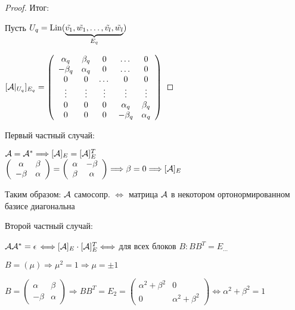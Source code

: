 \begin{theorem}
\begin{proof}
    Итог: 

    Пусть $U_q = \operatorname{Lin} (\underbrace{\tilde{v_1}, \tilde{w_1}, \dots, \tilde{v_l}, \tilde{w_l}}_{\text{$ E_q $}} )$
    
    $[\mathcal{A} |_{U_q}]_{E_q} = \left(\begin{array}{ccccc}
    \alpha_q & \beta_q & 0 & \dots & 0 \\ 
    -\beta_q & \alpha_q & 0 & \dots & 0 \\ 
    0 & 0 & \dots & 0 & 0 \\ 
    \vdots & \vdots & \vdots & \vdots & \vdots \\
    0 & 0 & 0 & \alpha_q & \beta_q \\ 
    0 & 0 & 0 & -\beta_q & \alpha_q
    \end{array}\right)$
\end{proof} 
\end{theorem}


\notice

Первый частный случай:

    $\mathcal{A} = \mathcal{A}^* \Longrightarrow [\mathcal{A}]_{E} = [\mathcal{A}]^T_{E}$ \\
    $\left(\begin{array}{cc}
    \alpha & \beta \\ 
    -\beta & \alpha
    \end{array}\right) = \left(\begin{array}{cc}
    \alpha & -\beta \\ 
    \beta & \alpha
    \end{array}\right) \Longrightarrow \beta = 0 \Longrightarrow [\mathcal{A}]_{E}$

    Таким образом: $\mathcal{A}$ самосопр. $\Longleftrightarrow$ матрица $\mathcal{A}$ в некотором ортонормированном базисе диагональна

Второй частный случай:

    $\mathcal{A} \mathcal{A}^* = \epsilon$ %
    $\Longleftrightarrow [\mathcal{A}]_{E} \cdot [\mathcal{A}]^T_{E} \Longleftrightarrow $ для всех блоков $B: BB^T = E_{\dots}$

    $B = (\mu) \Longrightarrow \mu^2 = 1 \Longrightarrow \mu = \pm 1$

    $B = \left(\begin{array}{cc}
    \alpha & \beta \\ 
    -\beta & \alpha
    \end{array}\right) \Longrightarrow BB^T = E_2 = \left(\begin{array}{cc}
    \alpha^2 + \beta^2 & 0 \\ 
    0 & \alpha^2 + \beta^2
    \end{array}\right) \Longleftrightarrow \alpha^2 + \beta^2 = 1$

